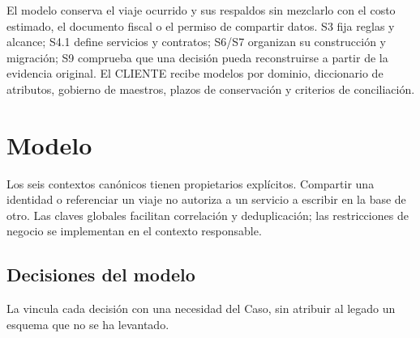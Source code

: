 \ProvideDocumentCommand{}
El modelo conserva el viaje ocurrido y sus respaldos sin mezclarlo con el costo estimado, el documento fiscal o el permiso de compartir datos. S3 fija reglas y alcance; S4.1 define servicios y contratos; S6/S7 organizan su construcción y migración; S9 comprueba que una decisión pueda reconstruirse a partir de la evidencia original. El CLIENTE recibe modelos por dominio, diccionario de atributos, gobierno de maestros, plazos de conservación y criterios de conciliación.

\section{Modelo}\label{sec:5-modelo}\label{sec:05-modelo}

Los seis contextos canónicos tienen propietarios explícitos. Compartir una identidad o referenciar un viaje no autoriza a un servicio a escribir en la base de otro. Las claves globales facilitan correlación y deduplicación; las restricciones de negocio se implementan en el contexto responsable.

\FloatBarrier
\subsection{Decisiones del modelo}\label{sec:5-entidades}\label{sec:05-decisiones-del-modelo}

La  vincula cada decisión con una necesidad del Caso, sin atribuir al legado un esquema que no se ha levantado.

